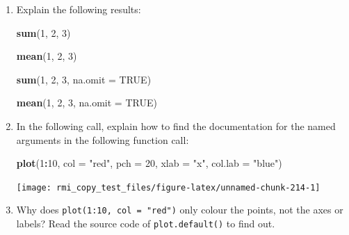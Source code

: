 \documentclass[]{book}
\newenvironment{Shaded}{\begin{snugshade}}{\end{snugshade}}
\newcommand{\DataTypeTok}[1]{\textcolor[rgb]{0.13,0.29,0.53}{#1}}
\newcommand{\DecValTok}[1]{\textcolor[rgb]{0.00,0.00,0.81}{#1}}
\newcommand{\KeywordTok}[1]{\textcolor[rgb]{0.13,0.29,0.53}{\textbf{#1}}}
\newcommand{\NormalTok}[1]{#1}
\newcommand{\OperatorTok}[1]{\textcolor[rgb]{0.81,0.36,0.00}{\textbf{#1}}}
\newcommand{\OtherTok}[1]{\textcolor[rgb]{0.56,0.35,0.01}{#1}}
\newcommand{\StringTok}[1]{\textcolor[rgb]{0.31,0.60,0.02}{#1}}
\theoremstyle{definition}
\theoremstyle{definition}
\theoremstyle{definition}
\theoremstyle{remark}
\begin{document}
\begin{enumerate}
\def\labelenumi{\arabic{enumi}.}
\item
  Explain the following results:

\begin{Shaded}
\begin{Highlighting}[]
\KeywordTok{sum}\NormalTok{(}\DecValTok{1}\NormalTok{, }\DecValTok{2}\NormalTok{, }\DecValTok{3}\NormalTok{)}
\end{Highlighting}
\end{Shaded}

\begin{Shaded}
\begin{Highlighting}[]
\KeywordTok{mean}\NormalTok{(}\DecValTok{1}\NormalTok{, }\DecValTok{2}\NormalTok{, }\DecValTok{3}\NormalTok{)}
\end{Highlighting}
\end{Shaded}

\begin{Shaded}
\begin{Highlighting}[]
\KeywordTok{sum}\NormalTok{(}\DecValTok{1}\NormalTok{, }\DecValTok{2}\NormalTok{, }\DecValTok{3}\NormalTok{, }\DataTypeTok{na.omit =} \OtherTok{TRUE}\NormalTok{)}
\end{Highlighting}
\end{Shaded}

\begin{Shaded}
\begin{Highlighting}[]
\KeywordTok{mean}\NormalTok{(}\DecValTok{1}\NormalTok{, }\DecValTok{2}\NormalTok{, }\DecValTok{3}\NormalTok{, }\DataTypeTok{na.omit =} \OtherTok{TRUE}\NormalTok{)}
\end{Highlighting}
\end{Shaded}
\item
  In the following call, explain how to find the documentation for the
  named arguments in the following function call:

\begin{Shaded}
\begin{Highlighting}[]
\KeywordTok{plot}\NormalTok{(}\DecValTok{1}\OperatorTok{:}\DecValTok{10}\NormalTok{, }\DataTypeTok{col =} \StringTok{"red"}\NormalTok{, }\DataTypeTok{pch =} \DecValTok{20}\NormalTok{, }\DataTypeTok{xlab =} \StringTok{"x"}\NormalTok{, }\DataTypeTok{col.lab =} \StringTok{"blue"}\NormalTok{)}
\end{Highlighting}
\end{Shaded}

  \begin{center}\texttt{[image: rmi\_copy\_test\_files/figure-latex/unnamed-chunk-214-1]} \end{center}
\item
  Why does \texttt{plot(1:10,\ col\ =\ "red")} only colour the points,
  not the axes or labels? Read the source code of
  \texttt{plot.default()} to find out.
\end{enumerate}
\end{document}
